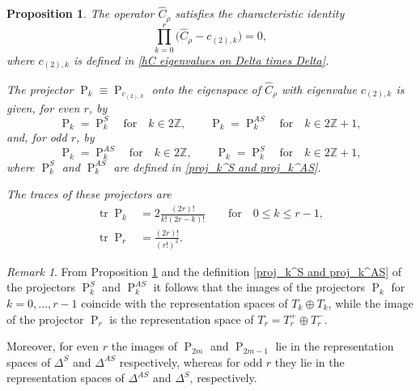 \documentclass[a4paper]{article}
\newcommand{\hC}{\widehat{C}}
\renewcommand{\=}{\ =\ }
\DeclareMathOperator{\proj}{P}
\DeclareMathOperator{\tr}{tr}
\numberwithin{equation}{section}
\newtheorem{proposition}{Proposition}
\theoremstyle{remark}
\newtheorem{remark}{Remark}
\begin{document}
\begin{proposition}\label{Prop: char identities for hC in rho otimes rho}
The operator $\hC_\rho$ satisfies the characteristic identity
\begin{equation}\label{hC_rho factorised identity}
\prod_{k=0}^r \big(\hC_\rho-c_{(2),k}\big)=0,
\end{equation}
where $c_{(2),k}$ is defined in
\eqref{hC eigenvalues on Delta times Delta}.

The projector $\proj_k\equiv \proj_{c_{(2),k}}$ onto the eigenspace of $\hC_\rho$ with eigenvalue $c_{(2),k}$ is given, for even $r$, by
\begin{equation}\label{sums of projectors Delta to rho for even r}
\proj_k=\proj_{k}^{S}\quad\text{for}\quad k\in 2\mathbb{Z},
\qquad
\proj_k=\proj_{k}^{AS}\quad\text{for}\quad k\in 2\mathbb{Z}+1,
\end{equation}
and, for odd $r$, by
\begin{equation}\label{sums of projectors Delta to rho for odd r}
\proj_k=\proj_{k}^{AS}\quad\text{for}\quad k\in 2\mathbb{Z},
\qquad
\proj_k=\proj_{k}^{S}\quad\text{for}\quad k\in 2\mathbb{Z}+1,
\end{equation}
where $\proj_k^S$ and $\proj_k^{AS}$ are defined in
\eqref{proj_k^S and proj_k^AS}.

The traces of these projectors are
\begin{equation}
\begin{aligned}
\tr \proj_k &= 2\frac{(2r)!}{k!(2r-k)!}
\qquad \text{for}\quad 0\le k\le r-1,\\
\tr \proj_r &= \frac{(2r)!}{(r!)^2}.
\end{aligned}
\end{equation}
\end{proposition}

\begin{remark}
From Proposition \ref{Prop: char identities for hC in rho otimes rho} and the definition \eqref{proj_k^S and proj_k^AS} of the projectors $\proj_k^{S}$ and $\proj_k^{AS}$ it follows that the images of the projectors $\proj_k$ for $k=0,\dots,r-1$ coincide with the representation spaces of $T_k\oplus T_k$, while the image of the projector $\proj_r$ is the representation space of $T_r=T_r^+\oplus T_r^-$.

Moreover, for even $r$ the images of $\proj_{2m}$ and $\proj_{2m-1}$ lie in the representation spaces of $\Delta^S$ and $\Delta^{AS}$ respectively, whereas for odd $r$ they lie in the representation spaces of $\Delta^{AS}$ and $\Delta^S$, respectively.
\end{remark}
\end{document}
